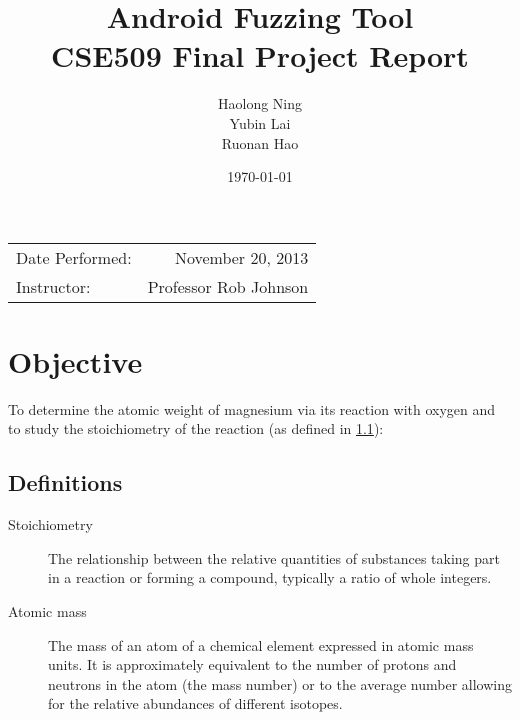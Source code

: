 \documentclass{article}
\title{Android Fuzzing Tool\\CSE509 Final Project Report} %
\author{Haolong Ning\\Yubin Lai\\Ruonan Hao} %
\date{\today} %
\begin{document}
\maketitle %

\begin{center}
\begin{tabular}{l r}
Date Performed: & November 20, 2013 \\ %
Instructor: & Professor Rob Johnson %
\end{tabular}
\end{center}



\section{Objective}

To determine the atomic weight of magnesium via its reaction with oxygen and to study the stoichiometry of the reaction (as defined in \ref{definitions}):\\

\begin{center}\end{center}


\subsection{Definitions}
\label{definitions}
\begin{description}
\item[Stoichiometry]
The relationship between the relative quantities of substances taking part in a reaction or forming a compound, typically a ratio of whole integers.
\item[Atomic mass]
The mass of an atom of a chemical element expressed in atomic mass units. It is approximately equivalent to the number of protons and neutrons in the atom (the mass number) or to the average number allowing for the relative abundances of different isotopes. 
\end{description} 
 
\end{document}
